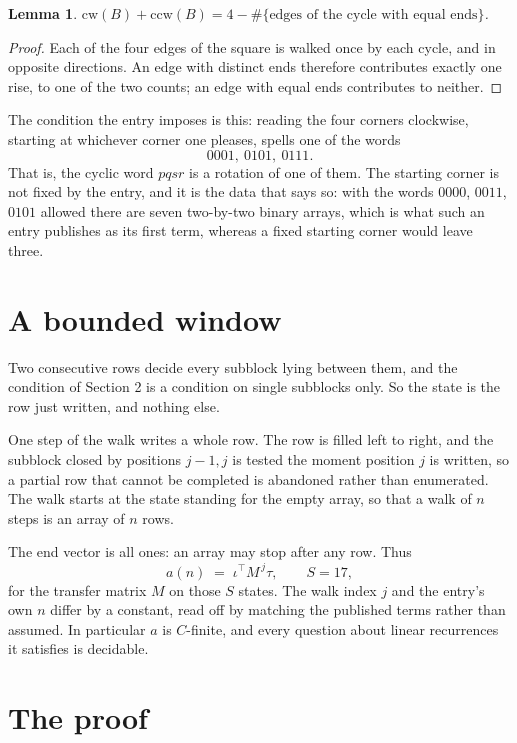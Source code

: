 \documentclass[11pt,a4paper]{article}
\theoremstyle{plain}
\newtheorem{lemma}[theorem]{Lemma}
\theoremstyle{definition}
\begin{document}
\begin{lemma}\label{lem:sum}
$\mathrm{cw}(B)+\mathrm{ccw}(B)=4-\#\{\text{edges of the cycle with equal ends}\}$.
\end{lemma}

\begin{proof}
Each of the four edges of the square is walked once by each cycle, and in opposite directions.
An edge with distinct ends therefore contributes exactly one rise, to one of the two counts;
an edge with equal ends contributes to neither.
\end{proof}

The condition the entry imposes is this: reading the four corners clockwise, starting at whichever corner one pleases, spells one of the words
\[
0001,\ 0101,\ 0111.
\]
That is, the cyclic word $pqsr$ is a rotation of one of them. The starting corner is not fixed by the entry, and it is the data that says so: with the words $0000$, $0011$, $0101$ allowed there are seven two-by-two binary arrays, which is what such an entry publishes as its first term, whereas a fixed starting corner would leave three.

\section{A bounded window}

Two consecutive rows decide every subblock lying between them, and the condition of Section 2 is a condition on single subblocks only. So the state is the row just written, and nothing else.

One step of the walk writes a whole row. The row is filled left to right, and the subblock
closed by positions $j-1,j$ is tested the moment position $j$ is written, so a partial row that
cannot be completed is abandoned rather than enumerated. The walk starts at the state standing
for the empty array, so that a walk of $n$ steps is an array of $n$ rows.

The end vector is all ones: an array may stop after any row. Thus
\[
a(n)\;=\;\iota^{\!\top}M^{\,j}\tau ,\qquad S=17,
\]
for the transfer matrix $M$ on those $S$ states. The walk index $j$ and the entry's own $n$
differ by a constant, read off by matching the published terms rather than assumed. In
particular $a$ is $C$-finite, and every question about linear recurrences it satisfies is
decidable.

\section{The proof}
\end{document}
